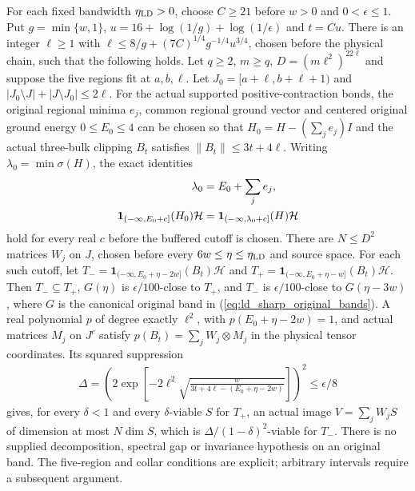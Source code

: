 \begin{lemma}
    \label{lem:ld_sharp_regional_polynomial_family}
    \leanok
    For each fixed bandwidth $\eta_{\rm LD}>0$, choose $C\ge21$
    before $w>0$ and $0<\epsilon\le1$. Put
    $g=\min\{w,1\}$, $u=16+\log(1/g)+\log(1/\epsilon)$ and $t=Cu$.
    There is an integer $\ell\ge1$ with
    $\ell\le8/g+(7C)^{1/4}g^{-1/4}u^{3/4}$, chosen before the physical
    chain, such that the following holds.
    Let $q\ge2$, $m\ge q$, $D=(m\ell^2)^{22\ell}$ and suppose the
    five regions fit at $a,b,\ell$. Let
    $J_0=[a+\ell,b+\ell+1)$ and
    $|J_0\setminus J|+|J\setminus J_0|\le2\ell$.
    For the actual supported positive-contraction bonds, the original
    regional minima $e_j$, common regional ground vector and centered
    original ground energy $0\le E_0\le4$ can be chosen so that
    $H_0=H-(\sum_j e_j)I$ and the actual three-bulk clipping $B_t$
    satisfies $\|B_t\|\le3t+4\ell$.
    Writing $\lambda_0=\min\sigma(H)$, the exact identities
    \begin{align}
        \lambda_0 & =E_0+\sum_j e_j,\notag                         \\
        \mathbf1_{(-\infty,E_0+c]}(H_0)\mathcal H
                  & =\mathbf1_{(-\infty,\lambda_0+c]}(H)\mathcal H
        \label{eq:ld_sharp_original_bands}
    \end{align}
    hold for every real $c$ before the buffered cutoff is chosen.
    There are $N\le D^2$ matrices $W_j$ on $J$, chosen before
    every $6w\le\eta\le\eta_{\rm LD}$ and source space.
    For each such cutoff, let
    $T_-=\mathbf1_{(-\infty,E_0+\eta-2w]}(B_t)\mathcal H$ and
    $T_+=\mathbf1_{(-\infty,E_0+\eta-w]}(B_t)\mathcal H$.
    Then $T_-\subseteq T_+$, $G(\eta)$ is $\epsilon/100$-close
    to $T_+$, and $T_-$ is $\epsilon/100$-close to $G(\eta-3w)$,
    where $G$ is the canonical original band in
    (\ref{eq:ld_sharp_original_bands}).
    A real polynomial $p$ of degree exactly $\ell^2$, with
    $p(E_0+\eta-2w)=1$, and actual matrices $M_j$ on $J^c$ satisfy
    $p(B_t)=\sum_j W_j\otimes M_j$ in the physical tensor coordinates.
    Its squared suppression
    \begin{align}
        \Delta=\left(2\exp\left[-2\ell^2
            \sqrt{\frac{w}{3t+4\ell-(E_0+\eta-2w)}}\right]\right)^2
        \le\epsilon/8
        \label{eq:ld_sharp_actual_suppression}
    \end{align}
    gives, for every $\delta<1$ and every $\delta$-viable $S$ for $T_+$,
    an actual image $V=\sum_j W_jS$ of dimension at most $N\dim S$,
    which is $\Delta/(1-\delta)^2$-viable for $T_-$.
    There is no supplied decomposition, spectral gap or invariance
    hypothesis on an original band. The five-region and collar conditions
    are explicit; arbitrary intervals require a subsequent argument.
\end{lemma}
